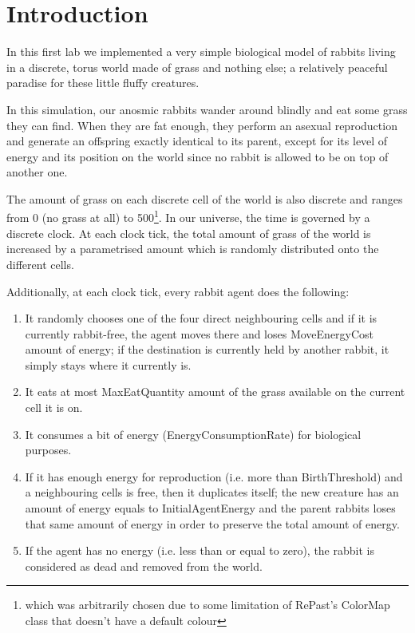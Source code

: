 \documentclass[12pt]{article}
\begin{document}



\section*{Introduction}

In this first lab we implemented a very simple biological model of rabbits living in a discrete, torus world made of grass and nothing else; a relatively peaceful paradise for these little fluffy creatures.

In this simulation, our anosmic rabbits wander around blindly and eat some grass they can find. When they are fat enough, they perform an asexual reproduction and generate an offspring exactly identical to its parent, except for its level of energy and its position on the world since no rabbit is allowed to be on top of another one.

The amount of grass on each discrete cell of the world is also discrete and ranges from 0 (no grass at all) to 500\footnote{which was arbitrarily chosen due to some limitation of RePast's ColorMap class that doesn't have a default colour}. In our universe, the time is governed by a discrete clock. At each clock tick, the total amount of grass of the world is increased by a parametrised amount which is randomly distributed onto the different cells.

Additionally, at each clock tick, every rabbit agent does the following:

\begin{enumerate}
	\item It randomly chooses one of the four direct neighbouring cells and if it is currently rabbit-free, the agent moves there and loses { MoveEnergyCost} amount of energy; if the destination is currently held by another rabbit, it simply stays where it currently is.
	\item It eats at most MaxEatQuantity amount of the grass available on the current cell it is on.
	\item It consumes a bit of energy (EnergyConsumptionRate) for biological purposes.
	\item If it has enough energy for reproduction (i.e. more than BirthThreshold) and a neighbouring cells is free, then it duplicates itself; the new creature has an amount of energy equals to InitialAgentEnergy and the parent rabbits loses that same amount of energy in order to preserve the total amount of energy.
	\item If the agent has no energy (i.e. less than or equal to zero), the rabbit is considered as dead and removed from the world.
\end{enumerate}
\end{document}
